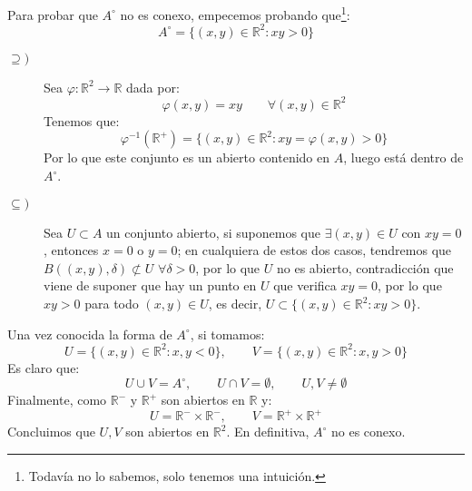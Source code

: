 \begin{ejercicio}
\noindent
Para probar que $A^\circ$ no es conexo, empecemos probando que\footnote{Todavía no lo sabemos, solo tenemos una intuición.}:
\begin{equation*}
    A^\circ = \{(x,y)\in \mathbb{R}^2 : xy > 0\}
\end{equation*}
\begin{description}
    \item [$\supseteq)$] Sea $\varphi:\mathbb{R}^2 \to \mathbb{R}$ dada por:
        \begin{equation*}
            \varphi(x,y) = xy \qquad \forall (x,y)\in \mathbb{R}^2
        \end{equation*}
        Tenemos que:
        \begin{equation*}
            \varphi^{-1}(\mathbb{R}^+) = \{(x,y)\in \mathbb{R}^2 : xy = \varphi(x,y) > 0\}
        \end{equation*}
        Por lo que este conjunto es un abierto contenido en $A$, luego está dentro de $A^\circ$.
    \item [$\subseteq)$] Sea $U\subset A$ un conjunto abierto, si suponemos que $\exists (x,y)\in U$ con $xy = 0$, entonces $x = 0$ o $y = 0$; en cualquiera de estos dos casos, tendremos que $B((x,y),\delta) \not\subset U$ $\forall \delta>0$, por lo que $U$ no es abierto, contradicción que viene de suponer que hay un punto en $U$ que verifica $xy = 0$, por lo que $xy > 0$ para todo $(x,y)\in U$, es decir, $U\subset \{(x,y)\in \mathbb{R}^2 : xy > 0\}$.
\end{description}
Una vez conocida la forma de $A^\circ$, si tomamos:
\begin{equation*}
    U = \{(x,y)\in \mathbb{R}^2 : x,y < 0\}, \qquad V = \{(x,y)\in \mathbb{R}^2 : x,y>0\}
\end{equation*}
Es claro que:
\begin{equation*}
    U\cup V = A^\circ, \qquad U\cap V = \emptyset, \qquad U, V \neq \emptyset 
\end{equation*}
Finalmente, como $\mathbb{R}^-$ y $\mathbb{R}^+$ son abiertos en $\mathbb{R}$ y:
\begin{equation*}
    U = \mathbb{R}^- \times \mathbb{R}^-, \qquad V = \mathbb{R}^+ \times \mathbb{R}^+
\end{equation*}
Concluimos que $U,V$ son abiertos en $\mathbb{R}^2$. En definitiva, $A^\circ$ no es conexo.
\end{ejercicio}


